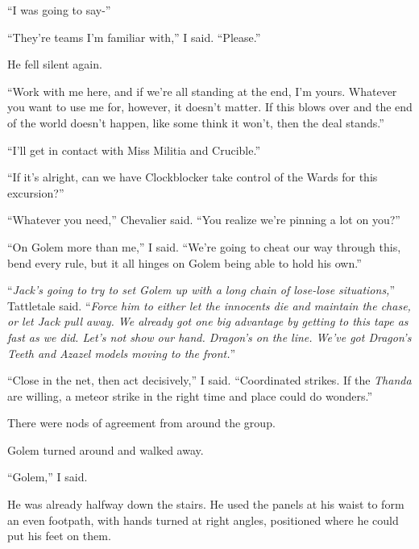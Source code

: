 ``I was going to say-''



``They're teams I'm familiar with,'' I said.  ``Please.''



He fell silent again.



``Work with me here, and if we're all standing at the end, I'm yours.  Whatever you want to use me for, however, it doesn't matter.  If this blows over and the end of the world doesn't happen, like some think it won't, then the deal stands.''



``I'll get in contact with Miss Militia and Crucible.''



``If it's alright, can we have Clockblocker take control of the Wards for this excursion?''



``Whatever you need,'' Chevalier said.  ``You realize we're pinning a lot on you?''



``On Golem more than me,'' I said.  ``We're going to cheat our way through this, bend every rule, but it all hinges on Golem being able to hold his own.''



``\emph{Jack's going to try to set Golem up with a long chain of lose-lose situations,}'' Tattletale said.  ``\emph{Force him to either let the innocents die and maintain the chase, or let Jack pull away.  We already got one big advantage by getting to this tape as fast as we did.  Let's not show our hand.  Dragon's on the line.  We've got Dragon's Teeth and Azazel models moving to the front.}''



``Close in the net, then act decisively,'' I said.  ``Coordinated strikes.  If the \emph{Thanda} are willing, a meteor strike in the right time and place could do wonders.''



There were nods of agreement from around the group.



Golem turned around and walked away.



``Golem,'' I said.



He was already halfway down the stairs.  He used the panels at his waist to form an even footpath, with hands turned at right angles, positioned where he could put his feet on them.




